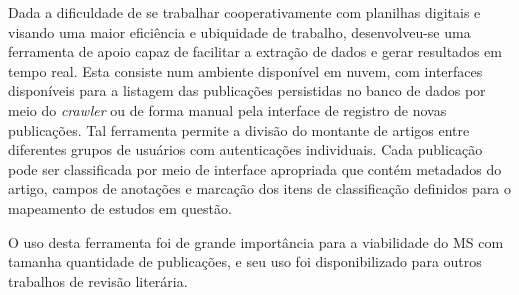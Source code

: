 Dada a dificuldade de se trabalhar cooperativamente com planilhas digitais e visando uma maior eficiência e ubiquidade de trabalho, desenvolveu-se uma ferramenta de apoio capaz de facilitar a extração de dados e gerar resultados em tempo real. Esta consiste num ambiente disponível em nuvem, com interfaces disponíveis para a listagem das publicações persistidas no banco de dados por meio do \emph{crawler} ou de forma manual pela interface de registro de novas publicações. Tal ferramenta permite a divisão do montante de artigos entre diferentes grupos de usuários com autenticações individuais. Cada publicação pode ser classificada por meio de interface apropriada que contém metadados do artigo, campos de anotações e marcação dos itens de classificação definidos para o mapeamento de estudos em questão.  

O uso desta ferramenta foi de grande importância para a viabilidade do MS com tamanha quantidade de publicações, e seu uso foi disponibilizado para outros trabalhos de revisão literária.


